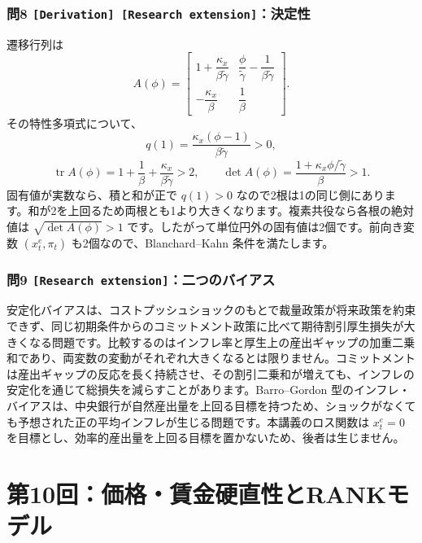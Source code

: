 \documentclass[
  japanese,
  lualatex,
  ja=standard,
  11pt,
  a4paper]{ltjsarticle}
\begin{document}
\subsubsection{\texorpdfstring{問8
\texttt{{[}Derivation{]}\ {[}Research\ extension{]}}：決定性}{問8 {[}Derivation{]} {[}Research extension{]}：決定性}}\label{ux554f8-derivation-research-extensionux6c7aux5b9aux6027}

遷移行列は \[
A(\phi)=
\begin{bmatrix}
1+\dfrac{\kappa_x}{\beta\widetilde\gamma}
&\dfrac{\phi}{\widetilde\gamma}-\dfrac{1}{\beta\widetilde\gamma}\\
-\dfrac{\kappa_x}{\beta}&\dfrac1\beta
\end{bmatrix}.
\] その特性多項式について、 \[
q(1)=\frac{\kappa_x(\phi-1)}{\beta\widetilde\gamma}>0,
\] \[
\operatorname{tr}A(\phi)
=1+\frac1\beta+\frac{\kappa_x}{\beta\widetilde\gamma}>2,
\qquad
\det A(\phi)=\frac{1+\kappa_x\phi/\widetilde\gamma}{\beta}>1.
\] 固有値が実数なら、積と和が正で \(q(1)>0\)
なので2根は1の同じ側にあります。和が2を上回るため両根とも1より大きくなります。複素共役なら各根の絶対値は
\(\sqrt{\det A(\phi)}>1\)
です。したがって単位円外の固有値は2個です。前向き変数 \((x_t^e,\pi_t)\)
も2個なので、Blanchard--Kahn 条件を満たします。


\subsubsection{\texorpdfstring{問9
\texttt{{[}Research\ extension{]}}：二つのバイアス}{問9 {[}Research extension{]}：二つのバイアス}}\label{ux554f9-research-extensionux4e8cux3064ux306eux30d0ux30a4ux30a2ux30b9}

安定化バイアスは、コストプッシュショックのもとで裁量政策が将来政策を約束できず、同じ初期条件からのコミットメント政策に比べて期待割引厚生損失が大きくなる問題です。比較するのはインフレ率と厚生上の産出ギャップの加重二乗和であり、両変数の変動がそれぞれ大きくなるとは限りません。コミットメントは産出ギャップの反応を長く持続させ、その割引二乗和が増えても、インフレの安定化を通じて総損失を減らすことがあります。Barro--Gordon
型のインフレ・バイアスは、中央銀行が自然産出量を上回る目標を持つため、ショックがなくても予想された正の平均インフレが生じる問題です。本講義のロス関数は
\(x_t^e=0\)
を目標とし、効率的産出量を上回る目標を置かないため、後者は生じません。

\clearpage

\section{第10回：価格・賃金硬直性とRANKモデル}\label{ux7b2c10ux56deux4fa1ux683cux8cc3ux91d1ux786cux76f4ux6027ux3068rankux30e2ux30c7ux30eb}
\end{document}
